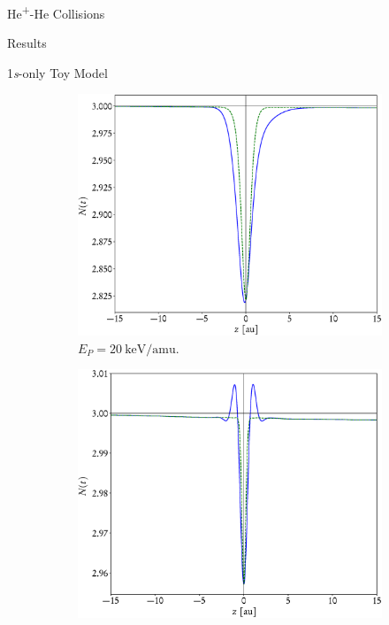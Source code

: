 \documentclass[a5paper, 9 pt]{extreport}
\begin{document}
\begin{chapter}{\texorpdfstring{He\textsuperscript{+}}{He+}-He Collisions \label{chap:hephe}}
\begin{section}{Results \label{sec:hephe-disc}}
\begin{subsection}{1\textit{s}-only Toy Model \label{sec:toy}}
         \begin{figure}[t]
            \centering
            \begin{subfigure}{.5\textwidth}
               \centering
               \includegraphics[width=\linewidth]{./images/toymodel/dNorm-1s-20.eps}
               \caption{$E_P = 20~\mathrm{keV}/\mathrm{amu}$. \label{fig:toy20}}
            \end{subfigure}%
            \begin{subfigure}{.5\textwidth}
               \centering
               \includegraphics[width=\linewidth]{./images/toymodel/dNorm-1s-1000.eps}

\end{subfigure}
\end{figure}
\end{subsection}
\end{section}
\end{chapter}
\end{document}
